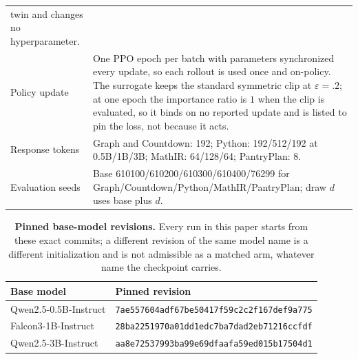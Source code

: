 \documentclass{article}
\newcommand{\1}{\mathbf 1}
\theoremstyle{remark}
\theoremstyle{definition}
\theoremstyle{plain}
\begin{document}
\begin{table}[!htbp]
\begin{tabularx}{\linewidth}{@{}P{.23\linewidth}Y@{}}
      twin and changes no hyperparameter. \\
    Policy update & One PPO epoch per batch with parameters synchronized every
      update, so each rollout is used once and on-policy. The surrogate keeps
      the standard symmetric clip at $\varepsilon=.2$; at one epoch the
      importance ratio is $1$ when the clip is evaluated, so it binds on no
      reported update and is listed to pin the loss, not because it acts. \\
    Response tokens & Graph and Countdown: 192; Python: 192/512/192
      at 0.5B/1B/3B; MathIR: 64/128/64; PantryPlan: 8. \\
    Evaluation seeds & Base 610100/610200/610300/610400/76299 for
      Graph/Countdown/Python/MathIR/PantryPlan; draw $d$ uses base plus $d$. \\
    \bottomrule
  \end{tabularx}
\end{table}

\begin{table}[!htbp]
\centering
\caption{\textbf{Pinned base-model revisions.} Every run in this paper starts
from these exact commits; a different revision of the same model name is a
different initialization and is not admissible as a matched arm, whatever
name the checkpoint carries.}
\label{tab:pinned-revisions}
\small
\begin{tabular}{@{}ll@{}}
\toprule
\textbf{Base model} & \textbf{Pinned revision} \\
\midrule
Qwen2.5-0.5B-Instruct & {\scriptsize\texttt{7ae557604adf67be50417f59c2c2f167def9a775}} \\
Falcon3-1B-Instruct & {\scriptsize\texttt{28ba2251970a01dd1edc7ba7dad2eb71216ccfdf}} \\
Qwen2.5-3B-Instruct & {\scriptsize\texttt{aa8e72537993ba99e69dfaafa59ed015b17504d1}} \\
\bottomrule
\end{tabular}
\end{table}
\end{document}
